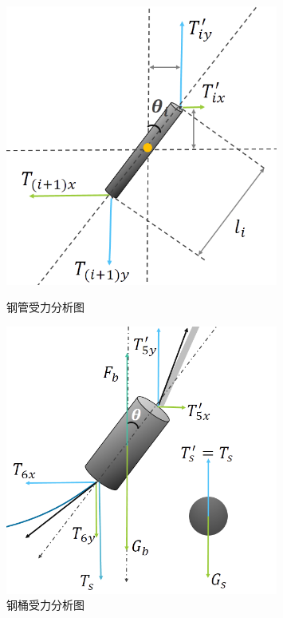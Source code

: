 \documentclass{cumcm}
\begin{document}
\begin{figure}[H]
  \begin{minipage}[t]{0.5\linewidth}   
    \centering   
    \includegraphics[width=0.8\textwidth]{img/pipe.png}   
    \caption{钢管受力分析图}   
    \label{fig:pipe}   
  \end{minipage}   
   \begin{minipage}[t]{0.5\linewidth} %
      \centering   
      \includegraphics[width=0.8\textwidth]{img/bottle.png}   
      \caption{钢桶受力分析图}   
      \label{fig:bottle}   
    \end{minipage} 
\end{figure}
\end{document}
